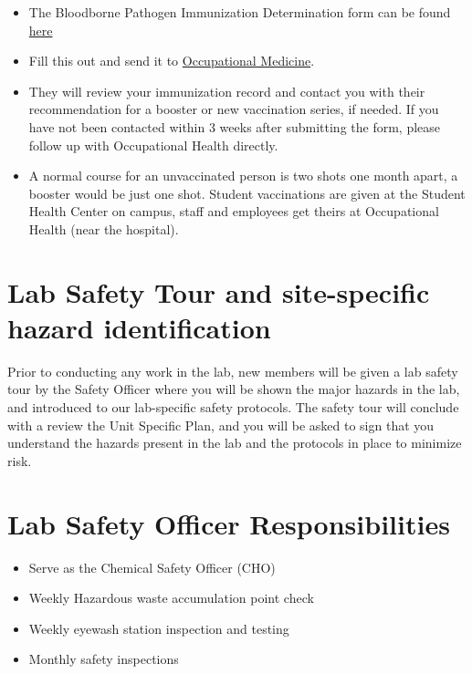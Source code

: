 \documentclass[
]{book}
\providecommand{\tightlist}{%
  \setlength{\itemsep}{0pt}\setlength{\parskip}{0pt}}
\begin{document}
\begin{itemize}
\tightlist
\item
  The Bloodborne Pathogen Immunization Determination form can be found \href{https://www.google.com/url?sa=t&source=web&rct=j&opi=89978449&url=https://ehs.psu.edu/sites/ehs/files/immunizationdetermination.doc&ved=2ahUKEwjktPLn3JuOAxVVKlkFHRmKLBgQFnoECBcQAQ&usg=AOvVaw1VFj5u8sX_YtMgqAmODOI2}{here}
\item
  Fill this out and send it to \href{https://hr.psu.edu/current-employee/occupational-medicine}{Occupational Medicine}.
\item
  They will review your immunization record and contact you with their recommendation for a booster or new vaccination series, if needed. If you have not been contacted within 3 weeks after submitting the form, please follow up with Occupational Health directly.
\item
  A normal course for an unvaccinated person is two shots one month apart, a booster would be just one shot. Student vaccinations are given at the Student Health Center on campus, staff and employees get theirs at Occupational Health (near the hospital).
\end{itemize}

\section{Lab Safety Tour and site-specific hazard identification}\label{lab-safety-tour-and-site-specific-hazard-identification}

Prior to conducting any work in the lab, new members will be given a lab safety tour by the Safety Officer where you will be shown the major hazards in the lab, and introduced to our lab-specific safety protocols. The safety tour will conclude with a review the Unit Specific Plan, and you will be asked to sign that you understand the hazards present in the lab and the protocols in place to minimize risk.

\section{Lab Safety Officer Responsibilities}\label{lab-safety-officer-responsibilities}

\begin{itemize}
\tightlist
\item
  Serve as the Chemical Safety Officer (CHO)
\item
  Weekly Hazardous waste accumulation point check
\item
  Weekly eyewash station inspection and testing
\item
  Monthly safety inspections
\end{itemize}
\end{document}
